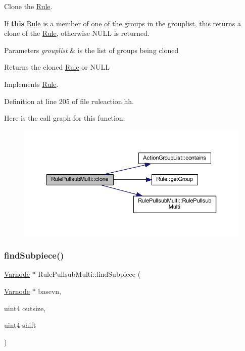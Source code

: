 Clone the \mbox{\hyperlink{class_rule}{Rule}}. 

If {\bfseries{this}} \mbox{\hyperlink{class_rule}{Rule}} is a member of one of the groups in the grouplist, this returns a clone of the \mbox{\hyperlink{class_rule}{Rule}}, otherwise N\+U\+LL is returned. 
\begin{DoxyParams}{Parameters}
{\em grouplist} & is the list of groups being cloned \\
\hline
\end{DoxyParams}
\begin{DoxyReturn}{Returns}
the cloned \mbox{\hyperlink{class_rule}{Rule}} or N\+U\+LL 
\end{DoxyReturn}


Implements \mbox{\hyperlink{class_rule_a70de90a76461bfa7ea0b575ce3c11e4d}{Rule}}.



Definition at line 205 of file ruleaction.\+hh.

Here is the call graph for this function\+:
\nopagebreak
\begin{figure}[H]
\begin{center}
\leavevmode
\includegraphics[width=350pt]{class_rule_pullsub_multi_ad97158dddae367b04cc50438c4380033_cgraph}
\end{center}
\end{figure}
\mbox{\label{class_rule_pullsub_multi_a92f1aaf99bec05ceb9a6fc3a418a6851}} 
\subsubsection{\texorpdfstring{findSubpiece()}{findSubpiece()}}
{\footnotesize\ttfamily \mbox{\hyperlink{class_varnode}{Varnode}} $\ast$ Rule\+Pullsub\+Multi\+::find\+Subpiece (\begin{DoxyParamCaption}\item[{\mbox{\hyperlink{class_varnode}{Varnode}} $\ast$}]{basevn,  }\item[{uint4}]{outsize,  }\item[{uint4}]{shift }\end{DoxyParamCaption})\hspace{0.3cm}{\ttfamily [static]}}



